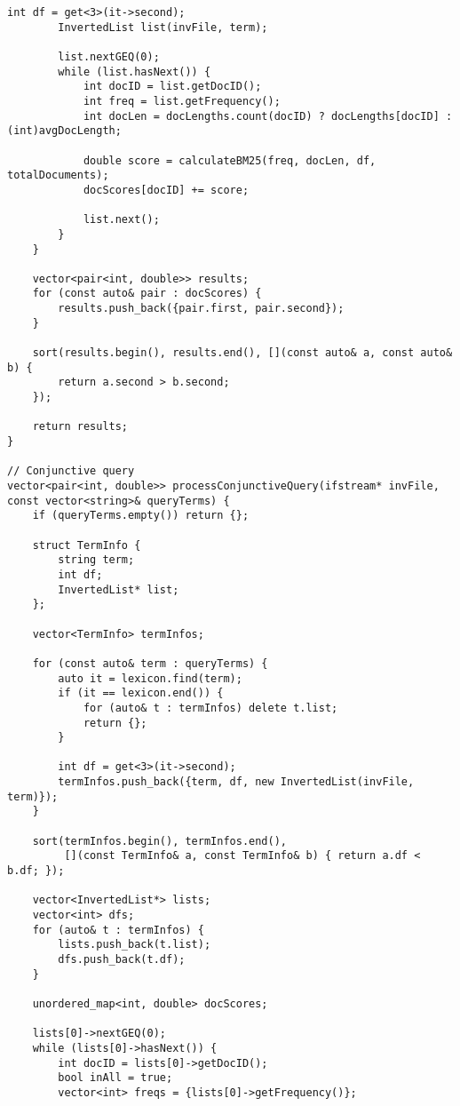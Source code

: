 \documentclass{article}
\begin{document}
\begin{lstlisting}[caption={The complete source code for the query processor component.}, label={lst:query}]
        int df = get<3>(it->second);
        InvertedList list(invFile, term);
        
        list.nextGEQ(0);
        while (list.hasNext()) {
            int docID = list.getDocID();
            int freq = list.getFrequency();
            int docLen = docLengths.count(docID) ? docLengths[docID] : (int)avgDocLength;
            
            double score = calculateBM25(freq, docLen, df, totalDocuments);
            docScores[docID] += score;
            
            list.next();
        }
    }
    
    vector<pair<int, double>> results;
    for (const auto& pair : docScores) {
        results.push_back({pair.first, pair.second});
    }
    
    sort(results.begin(), results.end(), [](const auto& a, const auto& b) {
        return a.second > b.second;
    });
    
    return results;
}

// Conjunctive query
vector<pair<int, double>> processConjunctiveQuery(ifstream* invFile, const vector<string>& queryTerms) {
    if (queryTerms.empty()) return {};
    
    struct TermInfo {
        string term;
        int df;
        InvertedList* list;
    };
    
    vector<TermInfo> termInfos;
    
    for (const auto& term : queryTerms) {
        auto it = lexicon.find(term);
        if (it == lexicon.end()) {
            for (auto& t : termInfos) delete t.list;
            return {};
        }
        
        int df = get<3>(it->second);
        termInfos.push_back({term, df, new InvertedList(invFile, term)});
    }
    
    sort(termInfos.begin(), termInfos.end(),
         [](const TermInfo& a, const TermInfo& b) { return a.df < b.df; });
    
    vector<InvertedList*> lists;
    vector<int> dfs;
    for (auto& t : termInfos) {
        lists.push_back(t.list);
        dfs.push_back(t.df);
    }

    unordered_map<int, double> docScores;
    
    lists[0]->nextGEQ(0);
    while (lists[0]->hasNext()) {
        int docID = lists[0]->getDocID();
        bool inAll = true;
        vector<int> freqs = {lists[0]->getFrequency()};
        

\end{lstlisting}
\end{document}
